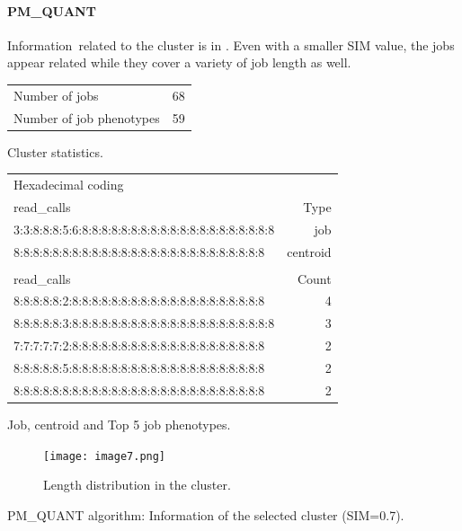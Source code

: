 \documentclass{jhps}
\begin{document}
\FloatBarrier
\paragraph{PM\_QUANT}
Information\ related to the cluster is in .
Even with a smaller SIM value, the jobs appear related while they cover a variety of job length as well.

\begin{cluster}
	\begin{subtable}{\textwidth}
		\centering
		\begin{tabular}{ll}
			Number of jobs      & 68  \\
			Number of job phenotypes & 59  \\
		\end{tabular}
		\caption{Cluster statistics.}
		\label{cluster:use_case:pm_quant:stats}
	\end{subtable}
	\medskip
	\begin{subtable}{\textwidth}
		\centering
		\begin{tiny}
			\begin{tabular}{l|r}
				\rowcolor{tblhead}
				Hexadecimal coding & \\
				\rowcolor{tblhead}
				read\_calls                                           & Type     \\
				\hline
				3:3:8:8:8:5:6:8:8:8:8:8:8:8:8:8:8:8:8:8:8:8:8:8:8:8:8 & job      \\
				8:8:8:8:8:8:8:8:8:8:8:8:8:8:8:8:8:8:8:8:8:8:8:8:8:8   & centroid \\
				\multicolumn{2}{l}{}\\
				\rowcolor{tblhead}
				read\_calls                                           & Count    \\
				\hline
				8:8:8:8:8:2:8:8:8:8:8:8:8:8:8:8:8:8:8:8:8:8:8:8:8:8   & 4        \\
				8:8:8:8:8:3:8:8:8:8:8:8:8:8:8:8:8:8:8:8:8:8:8:8:8:8:8 & 3        \\
				7:7:7:7:7:2:8:8:8:8:8:8:8:8:8:8:8:8:8:8:8:8:8:8:8:8   & 2        \\
				8:8:8:8:8:5:8:8:8:8:8:8:8:8:8:8:8:8:8:8:8:8:8:8:8:8   & 2        \\
				8:8:8:8:8:8:8:8:8:8:8:8:8:8:8:8:8:8:8:8:8:8:8:8:8:8   & 2        \\
			\end{tabular}
		\end{tiny}
		\caption{Job, centroid and Top 5 job phenotypes.}
		\label{cluster:use_case:pm_quant:top_jobs}
	\end{subtable}
	\medskip
	\begin{subfigure}{\textwidth}
		\centering
		\texttt{[image: image7.png]}
		\caption{Length distribution in the cluster.}
		\label{cluster:use_case:pm_quant:length}
	\end{subfigure}
	\caption{PM\_QUANT algorithm: Information of the selected cluster (SIM=0.7).}
	\label{cluster:use_case:pm_quant}
\end{cluster}
\end{document}
